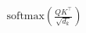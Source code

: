 \documentclass[preview]{standalone}
\begin{document}
\begin{align*}
\mathrm{softmax}\!\left(\frac{QK^{\top}}{\sqrt{d_k}}\right)
\end{align*}
\end{document}
